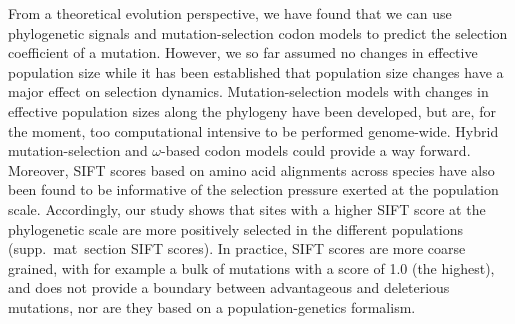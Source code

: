 \documentclass{article}
\begin{document}
    From a theoretical evolution perspective, we have found that we can use phylogenetic signals and mutation-selection codon models to predict the selection coefficient of a mutation.
    However, we so far assumed no changes in effective population size while it has been established that population size changes have a major effect on selection dynamics\cite{lanfear_population_2014, jones_shifting_2017, platt_protein_2018}.
    Mutation-selection models with changes in effective population sizes along the phylogeny have been developed\cite{latrille_inferring_2021}, but are, for the moment, too computational intensive to be performed genome-wide.
    Hybrid mutation-selection and $\omega$-based codon models could provide a way forward\cite{brevet_reconstructing_2021}.
    Moreover, SIFT scores based on amino acid alignments across species have also been found to be informative of the selection pressure exerted at the population scale\cite{chen_hunting_2021}.
    Accordingly, our study shows that sites with a higher SIFT score at the phylogenetic scale are more positively selected in the different populations (supp.\ mat\  section SIFT scores).
    In practice, SIFT scores are more coarse grained, with for example a bulk of mutations with a score of 1.0 (the highest), and does not provide a boundary between advantageous and deleterious mutations, nor are they based on a population-genetics formalism.
\end{document}
